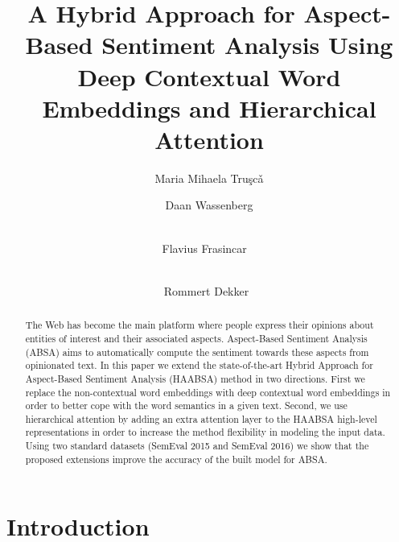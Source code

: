 \documentclass[hidelinks]{llncs}
\begin{document}
\title{A Hybrid Approach for Aspect-Based Sentiment Analysis Using Deep Contextual Word Embeddings and Hierarchical Attention}
\author{ Maria Mihaela Tru\c{s}c\v{a} \inst{(}\Envelope\inst{)} \and Daan Wassenberg \and  \\ Flavius Frasincar ~ 
\and \\ Rommert Dekker~
}
\maketitle              \begin{abstract}
The Web has become the main platform where people express their opinions about entities of interest and their associated aspects. Aspect-Based Sentiment Analysis (ABSA) aims to automatically compute the sentiment towards these aspects from opinionated text. In this paper we extend the state-of-the-art Hybrid Approach for Aspect-Based Sentiment Analysis (HAABSA) method in two directions. First we replace the non-contextual word embeddings with deep contextual word embeddings in order to better cope with the word semantics in a given text. Second, we use hierarchical attention by adding an extra attention layer to the HAABSA high-level representations in order to increase the method flexibility in modeling the input data. Using two standard datasets (SemEval 2015 and SemEval 2016) we show that the proposed extensions improve the accuracy of the built model for ABSA.

\end{abstract}


\section{Introduction} \label{sec: Introduction}
\end{document}
